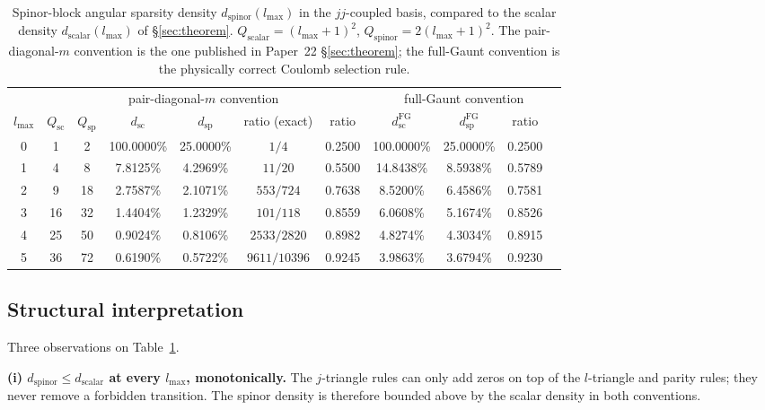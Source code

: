 \documentclass[twocolumn,pra,amsmath,amssymb,superscriptaddress]{revtex4-2}
\begin{document}
\begin{table}[h]
\caption{Spinor-block angular sparsity density $d_{\mathrm{spinor}}(l_{\max})$
in the $jj$-coupled basis, compared to the scalar density
$d_{\mathrm{scalar}}(l_{\max})$ of
\S\ref{sec:theorem}. $Q_{\mathrm{scalar}} = (l_{\max}+1)^2$,
$Q_{\mathrm{spinor}} = 2(l_{\max}+1)^2$. The pair-diagonal-$m$
convention is the one published in Paper~22 \S\ref{sec:theorem}; the
full-Gaunt convention is the physically correct Coulomb selection rule.}
\label{tab:d_spinor}
\begin{ruledtabular}
\begin{tabular}{c|cccccc|cccc}
 & \multicolumn{6}{c|}{pair-diagonal-$m$ convention} & \multicolumn{4}{c}{full-Gaunt convention} \\
$l_{\max}$ & $Q_{\mathrm{sc}}$ & $Q_{\mathrm{sp}}$ & $d_{\mathrm{sc}}$ & $d_{\mathrm{sp}}$ & ratio (exact) & ratio & $d_{\mathrm{sc}}^{\mathrm{FG}}$ & $d_{\mathrm{sp}}^{\mathrm{FG}}$ & ratio \\
\hline
0 & 1  & 2  & 100.0000\% & 25.0000\% & $1/4$        & 0.2500 & 100.0000\% & 25.0000\% & 0.2500 \\
1 & 4  & 8  & 7.8125\%   & 4.2969\%  & $11/20$      & 0.5500 & 14.8438\%  & 8.5938\%  & 0.5789 \\
2 & 9  & 18 & 2.7587\%   & 2.1071\%  & $553/724$    & 0.7638 & 8.5200\%   & 6.4586\%  & 0.7581 \\
3 & 16 & 32 & 1.4404\%   & 1.2329\%  & $101/118$    & 0.8559 & 6.0608\%   & 5.1674\%  & 0.8526 \\
4 & 25 & 50 & 0.9024\%   & 0.8106\%  & $2533/2820$  & 0.8982 & 4.8274\%   & 4.3034\%  & 0.8915 \\
5 & 36 & 72 & 0.6190\%   & 0.5722\%  & $9611/10396$ & 0.9245 & 3.9863\%   & 3.6794\%  & 0.9230 \\
\end{tabular}
\end{ruledtabular}
\end{table}

\subsection{Structural interpretation}

Three observations on Table~\ref{tab:d_spinor}.

\textbf{(i) $d_{\mathrm{spinor}} \leq d_{\mathrm{scalar}}$ at every $l_{\max}$, monotonically.}
The $j$-triangle rules can only add zeros on top of the $l$-triangle
and parity rules; they never remove a forbidden transition. The
spinor density is therefore bounded above by the scalar density in
both conventions.
\end{document}
